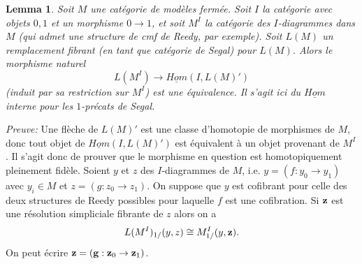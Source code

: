 \documentclass[12pt]{article}
\newtheorem{lemma}{Lemma}[section]
\begin{document}
\begin{lemma}
\label{equivalence2}
Soit $M$ une cat\'egorie de mod\`eles ferm\'ee. Soit $I$ la cat\'egorie
avec objets $0,1$ et un morphisme $0\rightarrow 1$, et soit $M^I$ la
cat\'egorie des $I$-diagrammes dans $M$ (qui admet une structure de cmf de
Reedy, par exemple). Soit $L(M)$ un remplacement fibrant (en tant que
cat\'egorie de Segal) pour $L(M)$. Alors le morphisme naturel
$$
L(M^I)\rightarrow \underline{Hom}(I, L(M)')
$$
(induit par sa restriction sur $M^I$) est une \'equivalence. Il s'agit ici du
$\underline{Hom}$ interne pour les $1$-pr\'ecats de Segal.
\end{lemma}
{\em Preuve:}
Une fl\`eche de $L(M)'$ est une classe d'homotopie de morphismes de $M$,
donc tout objet de $\underline{Hom}(I, L(M)')$ est \'equivalent \`a un objet
provenant de $M^I$. Il s'agit donc de prouver que le morphisme en question est
homotopiquement pleinement fid\`ele. Soient $y$ et $z$ des $I$-diagrammes de
$M$, i.e. $y= (f: y_0\rightarrow y_1)$ avec $y_i\in M$ et
$z= (g: z_0\rightarrow z_1)$.
On suppose que $y$ est cofibrant pour celle
des deux structures de Reedy possibles pour laquelle
$f$ est une cofibration.
Si ${\bf z}$ est une r\'esolution simpliciale
fibrante de $z$ alors on a
$$
L(M^I)_{1/}(y,z) \cong M^I_{1/}(y, {\bf z}).
$$
On peut \'ecrire ${\bf z} = ({\bf g}: {\bf z}_0\rightarrow {\bf z}_1)$.
\end{document}
